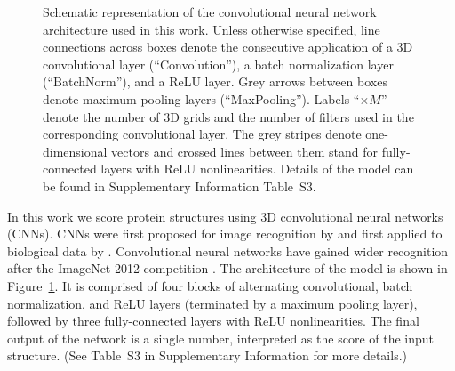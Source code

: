 \documentclass{bioinfo}
\begin{document}
\begin{figure}[t]
    \centerline{}
%
    \vspace{-10pt}
    \caption{Schematic representation of the convolutional neural
    network architecture used in this work. Unless otherwise specified, line connections across
    boxes denote the consecutive application of a 3D convolutional
    layer (``Convolution''), a batch normalization layer
    (``BatchNorm''), and a ReLU layer. Grey arrows between boxes denote
    maximum pooling layers (``MaxPooling''). Labels ``$\times M$''
    denote the number of 3D grids and the number of filters used in the corresponding
    convolutional layer.
    The grey stripes denote
    one-dimensional vectors and crossed lines between them stand for
    fully-connected layers with ReLU nonlinearities. Details of the
    model can be found in Supplementary Information Table~S3.}
    \label{Fig:CNNModel}
\end{figure}

In this work we score protein structures using 3D convolutional neural
networks (CNNs). CNNs were first proposed for image recognition by
\citet{lecun1989backpropagation} and first applied to biological data
by \citet{bengio1990neural}. Convolutional neural networks have gained wider
recognition after the ImageNet 2012 competition
\citep{krizhevsky2012imagenet}. The architecture of the model is shown
in Figure~\ref{Fig:CNNModel}.  It is comprised of four blocks of
alternating convolutional, batch normalization, and ReLU layers
(terminated by a maximum pooling layer), followed by three
fully-connected layers with ReLU nonlinearities. The final output of
the network is a single number, interpreted as the score of the input
structure. (See Table~S3 in Supplementary Information for more
details.)
\end{document}

